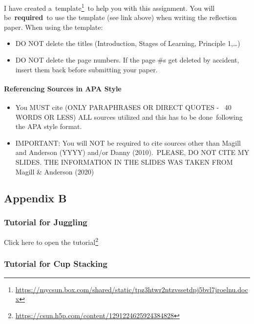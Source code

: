 \documentclass[
  letterpaper,
  DIV=11,
  numbers=noendperiod]{scrartcl}
\let\oldparagraph\paragraph
\renewcommand{\paragraph}[1]{\oldparagraph{#1}\mbox{}}
\providecommand{\tightlist}{%
  \setlength{\itemsep}{0pt}\setlength{\parskip}{0pt}}\usepackage{longtable,booktabs,array}
\DeclareRobustCommand{\href}[2]{#2\footnote{\url{#1}}}
\begin{document}
I have created
a~\href{https://mycsun.box.com/shared/static/tpz3htwr2ntzvssetdpj5bvl7jroelnu.docx}{template}~to
help you with this assignment. You will be~\textbf{required}~to use the
template (see link above) when writing the reflection paper. When using
the template:

\begin{itemize}
\tightlist
\item
  DO NOT delete the titles (Introduction, Stages of Learning, Principle
  1,\ldots)
\item
  DO NOT delete the page numbers. If the page \#s get deleted by
  accident, insert them back before submitting your paper.
\end{itemize}

\hypertarget{referencing-sources-in-apa-style}{%
\paragraph{Referencing Sources in APA
Style}\label{referencing-sources-in-apa-style}}

\begin{itemize}
\tightlist
\item
  You MUST cite (ONLY PARAPHRASES OR DIRECT QUOTES -~ 40 WORDS OR LESS)
  ALL sources utilized and this has to be done~following the APA style
  format.~
\item
  IMPORTANT: You will NOT be required to cite sources other than Magill
  and Anderson (YYYY) and/or Danny (2010).~PLEASE, DO NOT CITE MY
  SLIDES. THE INFORMATION IN THE SLIDES WAS TAKEN FROM Magill \&
  Anderson (2020)
\end{itemize}

\hypertarget{sec-appendix-b}{%
\subsection{Appendix B}\label{sec-appendix-b}}

\hypertarget{tutorial-for-juggling}{%
\subsubsection{Tutorial for Juggling}\label{tutorial-for-juggling}}

\href{https://csun.h5p.com/content/1291224625924384828}{Click here to
open the tutorial}

\hypertarget{tutorial-for-cup-stacking}{%
\subsubsection{Tutorial for Cup
Stacking}\label{tutorial-for-cup-stacking}}
\end{document}
